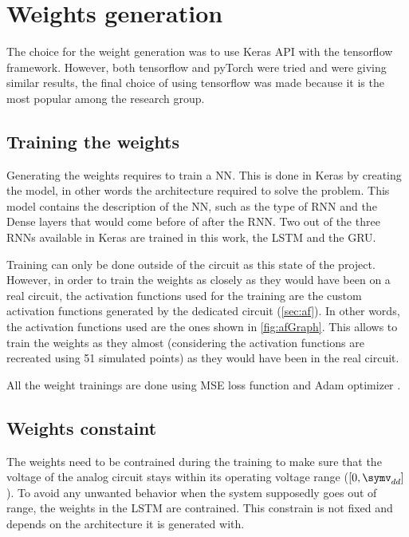 \section{Weights generation}
\label{sec:genwei}

The choice for the weight generation was to use Keras API with the tensorflow framework. However, both tensorflow and pyTorch were tried and were giving similar results, the final choice of using tensorflow was made because it is the most popular among the research group.

\subsection{Training the weights}

Generating the weights requires to train a \ac{NN}. This is done in Keras by creating the model, in other words the architecture required to solve the problem. This model contains the description of the \ac{NN}, such as the type of \ac{RNN} and the Dense layers that would come before of after the \ac{RNN}. Two out of the three \acp{RNN} available in Keras are trained in this work, the \ac{LSTM} and the \ac{GRU}.

Training can only be done outside of the circuit as this state of the project. However, in order to train the weights as closely as they would have been on a real circuit, the activation functions used for the training are the custom activation functions generated by the dedicated circuit (\cref{sec:af}). In other words, the activation functions used are the ones shown in \cref{fig:afGraph}. This allows to train the weights as they almost (considering the activation functions are recreated using 51 simulated points) as they would have been in the real circuit.

All the weight trainings are done using \ac{MSE} loss function and Adam optimizer \cite{adamOpti}.

\subsection{Weights constaint}

The weights need to be contrained during the training to make sure that the voltage of the analog circuit stays within its operating voltage range ($[0,\symv_{dd}]$). To avoid any unwanted behavior when the system supposedly goes out of range, the weights in the \ac{LSTM} are contrained. This constrain is not fixed and depends on the architecture it is generated with.


